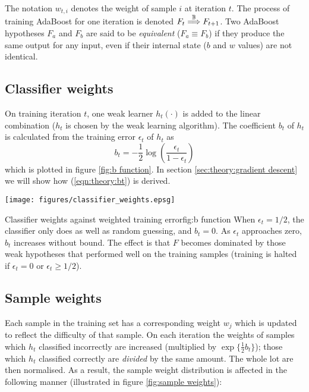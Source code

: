 The notation $w_{t,i}$ denotes the weight of sample $i$ at iteration
$t$.  The process of training AdaBoost for one iteration is denoted $F_t
\stackrel{\mathbb{B}}{\Longrightarrow} F_{t+1}$.   Two AdaBoost hypotheses $F_a$ and $F_b$ are
said to be \emph{equivalent} ($F_a \equiv F_b$) if they produce the
same output for any input, even if their internal state ($b$ and $w$
values) are not identical.

\subsection{Classifier weights}
\label{sec:classifier weights}

On training iteration $t$, one weak learner $h_t(\cdot)$ is added to
the linear combination ($h_t$ is chosen by the weak learning
algorithm).  The coefficient $b_t$ of $h_t$ is calculated from the 
training error $\epsilon_t$ of $h_t$ as 
%
\begin{equation}
b_t = - \frac{1}{2} \log \left( \frac{\epsilon_t}{1 - \epsilon_t} \right)
\label{eqn:theory:bt}
\end{equation}
%
which is plotted in figure \ref{fig:b function}.  In section
\ref{sec:theory:gradient descent} we will show how
(\ref{eqn:theory:bt}) is derived.

\begin{linefigure}
\begin{center}
\texttt{[image: figures/classifier\_weights.epsg]}
\end{center}
\begin{capt}{Classifier weights against weighted training error}{fig:b
function}
When $\epsilon_t = 1/2$, the classifier only does as well as random
guessing, and $b_t = 0$.  As $\epsilon_t$ approaches zero, $b_t$
increases without bound.  The effect is that $F$ becomes dominated by
those weak hypotheses that performed well on the training samples
(training is halted if $\epsilon_t = 0$ or $\epsilon_t \geq
1/2$).
\end{capt}
\end{linefigure}


\subsection{Sample weights}
\label{sec:sample weights}

Each sample in the training set has a corresponding weight $w_j$ which
is updated to reflect the difficulty of that sample.  On each
iteration the weights of samples which $h_t$ classified incorrectly
are increased (multiplied by $\exp \{\frac{1}{2} b_t \}$); those which
$h_t$ classified correctly are \emph{divided} by the same amount.  The
whole lot are then normalised.  As a result, the sample weight
distribution is affected in the following manner (illustrated in
figure \ref{fig:sample weights}): 

